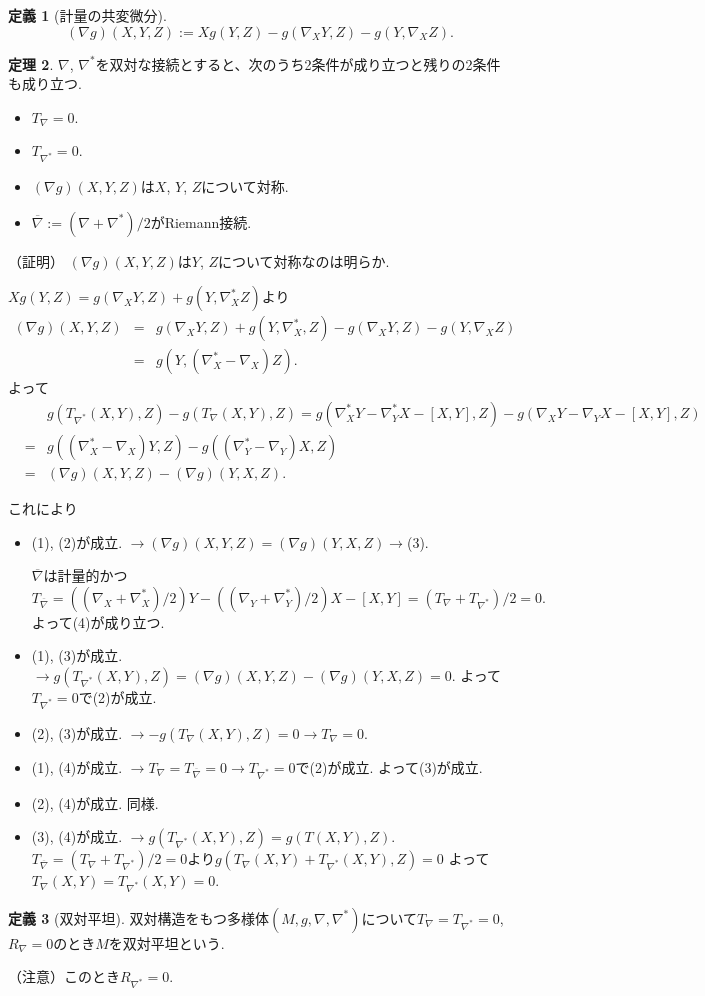 \documentclass{jsarticle}
\newcommand{\con}{\nabla}
\newcommand{\dcon}{\con^{*}}
\newcommand{\mcon}{\overline{\con}}
\theoremstyle{definition}
\newtheorem{theorem}{定理}
\newtheorem{definition}[theorem]{定義}
\numberwithin{theorem}{section}
\begin{document}
\begin{definition}[計量の共変微分]
\[
(\con g)(X,Y,Z):=Xg(Y,Z)-g(\con_X Y,Z)-g(Y,\con_X Z).
\]
\end{definition}
\begin{theorem}
$\con$, $\dcon$を双対な接続とすると、次のうち2条件が成り立つと残りの2条件も成り立つ.
\begin{itemize}
\item[(1)] $T_{\con}=0$.
\item[(2)] $T_{\dcon}=0$.
\item[(3)] $(\con g)(X,Y,Z)$は$X$, $Y$, $Z$について対称.
\item[(4)] $\mcon :=(\con+\dcon)/2$がRiemann接続.
\end{itemize}
\end{theorem}

（証明）
$(\con g)(X,Y,Z)$は$Y$, $Z$について対称なのは明らか.

$Xg(Y,Z)=g(\con_X Y,Z)+g(Y,\dcon_X Z)$より
\begin{eqnarray*}
(\con g)(X,Y,Z)&=&g(\con_X Y,Z)+g(Y,\dcon_X,Z)-g(\con_X Y,Z)-g(Y,\con_X Z)\\
&=&g(Y,(\dcon_X-\con_X)Z).
\end{eqnarray*}
よって
\begin{eqnarray*}
&&g(T_{\dcon}(X,Y),Z)-g(T_{\con}(X,Y),Z)=g(\dcon_X Y-\dcon_Y X-[X,Y],Z)-g(\con_X Y-\con_Y X-[X,Y],Z)\\
&=&g((\dcon_X-\con_X)Y,Z)-g((\dcon_Y-\con_Y)X,Z)\\
&=&(\con g)(X,Y,Z)-(\con g)(Y,X,Z).
\end{eqnarray*}

これにより
\begin{itemize}
\item (1), (2)が成立. $\rightarrow (\con g)(X,Y,Z)=(\con g)(Y,X,Z) \rightarrow$(3).

$\mcon$は計量的かつ
\[
T_{\mcon}=((\con_X+\dcon_X)/2) Y-((\con_Y+\dcon_Y)/2) X-[X,Y]=(T_{\con}+T_{\dcon})/2=0.
\]
よって(4)が成り立つ.

\item (1), (3)が成立. $\rightarrow g(T_{\dcon}(X,Y),Z)=(\con g)(X,Y,Z)-(\con g)(Y,X,Z)=0$.
よって$T_{\dcon}=0$で(2)が成立.

\item (2), (3)が成立. $\rightarrow -g(T_{\con}(X,Y),Z)=0 \rightarrow T_{\con}=0$.

\item (1), (4)が成立. $\rightarrow T_{\con}=T_{\mcon}=0 \rightarrow T_{\dcon}=0$で(2)が成立. よって(3)が成立.

\item (2), (4)が成立. 同様.
\item (3), (4)が成立. $\rightarrow g(T_{\dcon}(X,Y),Z)=g(T(X,Y),Z)$.
$T_{\mcon}=(T_{\con}+T_{\dcon})/2=0$より$g(T_{\con}(X,Y)+T_{\dcon}(X,Y),Z)=0$
よって$T_{\con}(X,Y)=T_{\dcon}(X,Y)=0$.
\end{itemize}
\begin{definition}[双対平坦]
双対構造をもつ多様体$(M,g,\con,\dcon)$について$T_{\con}=T_{\dcon}=0$, $R_{\con}=0$のとき$M$を双対平坦という.
\end{definition}
（注意）このとき$R_{\dcon}=0$.
\end{document}
